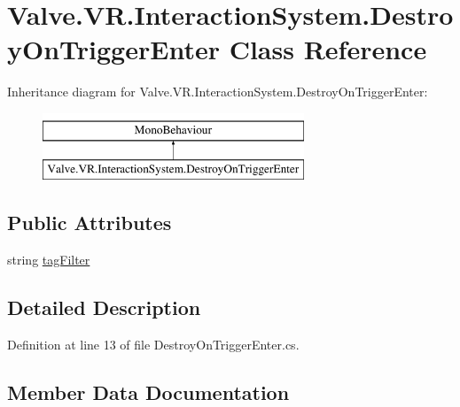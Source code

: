 \hypertarget{class_valve_1_1_v_r_1_1_interaction_system_1_1_destroy_on_trigger_enter}{}\section{Valve.\+V\+R.\+Interaction\+System.\+Destroy\+On\+Trigger\+Enter Class Reference}
\label{class_valve_1_1_v_r_1_1_interaction_system_1_1_destroy_on_trigger_enter}
Inheritance diagram for Valve.\+V\+R.\+Interaction\+System.\+Destroy\+On\+Trigger\+Enter\+:\begin{figure}[H]
\begin{center}
\leavevmode
\includegraphics[height=2.000000cm]{class_valve_1_1_v_r_1_1_interaction_system_1_1_destroy_on_trigger_enter}
\end{center}
\end{figure}
\subsection*{Public Attributes}
\begin{DoxyCompactItemize}
\item 
string \mbox{\hyperlink{class_valve_1_1_v_r_1_1_interaction_system_1_1_destroy_on_trigger_enter_a791b4a94993f8136478d31125623f0d5}{tag\+Filter}}
\end{DoxyCompactItemize}


\subsection{Detailed Description}


Definition at line 13 of file Destroy\+On\+Trigger\+Enter.\+cs.



\subsection{Member Data Documentation}
\mbox{\label{class_valve_1_1_v_r_1_1_interaction_system_1_1_destroy_on_trigger_enter_a791b4a94993f8136478d31125623f0d5}} 
